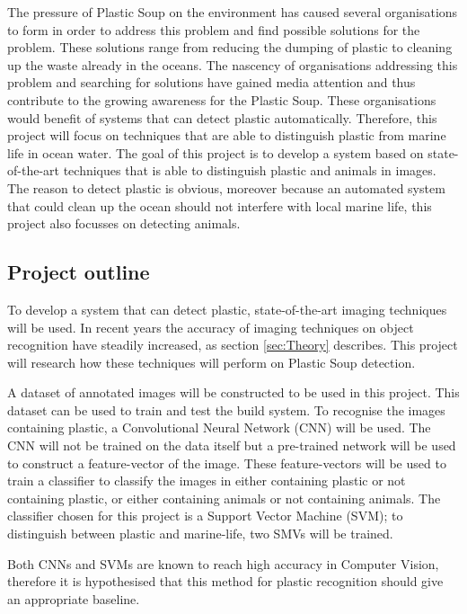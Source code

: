 The pressure of Plastic Soup on the environment has caused several organisations to form in order to address this problem and find possible solutions for the problem.
These solutions range from reducing the dumping of plastic to cleaning up the waste already in the oceans.
The nascency of organisations addressing this problem and searching for solutions have gained media attention and thus contribute to the growing awareness for the Plastic Soup.
These organisations would benefit of systems that can detect plastic automatically.
Therefore, this project will focus on techniques that are able to distinguish plastic from marine life in ocean water.
The goal of this project is to develop a system based on state-of-the-art techniques that is able to distinguish plastic and animals in images.
The reason to detect plastic is obvious, moreover because an automated system that could clean up the ocean should not interfere with local marine life, this project also focusses on detecting animals.

\subsection{Project outline}
\label{sec:Intro-Me}
To develop a system that can detect plastic, state-of-the-art imaging techniques will be used.
In recent years the accuracy of imaging techniques on object recognition have steadily increased, as section \ref{sec:Theory} describes.
This project will research how these techniques will perform on Plastic Soup detection.

A dataset of annotated images will be constructed to be used in this project.
This dataset can be used to train and test the build system.
To recognise the images containing plastic, a Convolutional Neural Network (CNN) will be used.
The CNN will not be trained on the data itself but a pre-trained network will be used to construct a feature-vector of the image.
These feature-vectors will be used to train a classifier to classify the images in either containing plastic or not containing plastic, or either containing animals or not containing animals.
The classifier chosen for this project is a Support Vector Machine (SVM); to distinguish between plastic and marine-life, two SMVs will be trained.

Both CNNs and SVMs are known to reach high accuracy in Computer Vision, therefore it is hypothesised that this method for plastic recognition should give an appropriate baseline.

